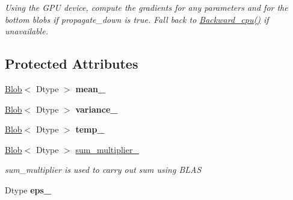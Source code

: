 \begin{DoxyCompactItemize}
\begin{DoxyCompactList}\small\item\em Using the G\+PU device, compute the gradients for any parameters and for the bottom blobs if propagate\+\_\+down is true. Fall back to \hyperlink{classcaffe_1_1MVNLayer_a0f66f9d749ad14d41b68eaf507dc1161}{Backward\+\_\+cpu()} if unavailable. \end{DoxyCompactList}\end{DoxyCompactItemize}
\subsection*{Protected Attributes}
\begin{DoxyCompactItemize}
\item 
\hyperlink{classcaffe_1_1Blob}{Blob}$<$ Dtype $>$ {\bfseries mean\+\_\+}\hypertarget{classcaffe_1_1MVNLayer_a341d117310ac1b03bbde07e359e241ac}{}\label{classcaffe_1_1MVNLayer_a341d117310ac1b03bbde07e359e241ac}

\item 
\hyperlink{classcaffe_1_1Blob}{Blob}$<$ Dtype $>$ {\bfseries variance\+\_\+}\hypertarget{classcaffe_1_1MVNLayer_a930f6ce43aed62aaa45c9326e4858c5c}{}\label{classcaffe_1_1MVNLayer_a930f6ce43aed62aaa45c9326e4858c5c}

\item 
\hyperlink{classcaffe_1_1Blob}{Blob}$<$ Dtype $>$ {\bfseries temp\+\_\+}\hypertarget{classcaffe_1_1MVNLayer_a5ec934aff15cf2e52b0fba60a1fb387c}{}\label{classcaffe_1_1MVNLayer_a5ec934aff15cf2e52b0fba60a1fb387c}

\item 
\hyperlink{classcaffe_1_1Blob}{Blob}$<$ Dtype $>$ \hyperlink{classcaffe_1_1MVNLayer_ade50bbee48a55e637e8c3e3f44f9618a}{sum\+\_\+multiplier\+\_\+}\hypertarget{classcaffe_1_1MVNLayer_ade50bbee48a55e637e8c3e3f44f9618a}{}\label{classcaffe_1_1MVNLayer_ade50bbee48a55e637e8c3e3f44f9618a}

\begin{DoxyCompactList}\small\item\em sum\+\_\+multiplier is used to carry out sum using B\+L\+AS \end{DoxyCompactList}\item 
Dtype {\bfseries eps\+\_\+}\hypertarget{classcaffe_1_1MVNLayer_a76c620f1b61ffcc8bca0e733bc5bb29c}{}\label{classcaffe_1_1MVNLayer_a76c620f1b61ffcc8bca0e733bc5bb29c}

\end{DoxyCompactItemize}


